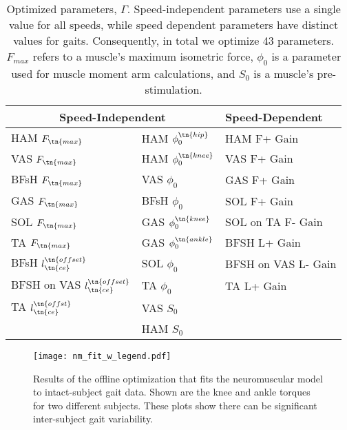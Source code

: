 \begin{table}    
    \centering
    \begin{tabular}{ll|l}
        \multicolumn{2}{c|}{Speed-Independent} & Speed-Dependent \\
        \hline
        HAM $F_\tn{max}$                    & HAM $\phi_0^\tn{hip}$   & HAM F+ Gain         \\
        VAS $F_\tn{max}$                    & HAM $\phi_0^\tn{knee}$  & VAS F+ Gain         \\
        BFsH $F_\tn{max}$                   & VAS $\phi_0$            & GAS F+ Gain         \\
        GAS $F_\tn{max}$                    & BFsH $\phi_0$           & SOL F+ Gain         \\
        SOL $F_\tn{max}$                    & GAS $\phi_0^\tn{knee}$  & SOL on TA F- Gain   \\
        TA  $F_\tn{max}$                    & GAS $\phi_0^\tn{ankle}$ & BFSH L+ Gain        \\
        BFsH $l_\tn{ce}^\tn{offset}$        & SOL $\phi_0$            & BFSH on VAS L- Gain \\
        BFSH on VAS $l_\tn{ce}^\tn{offset}$ & TA  $\phi_0$            & TA L+ Gain          \\
        TA $l_\tn{ce}^\tn{offst}$           & VAS $S_0$               &                     \\
                                            & HAM $S_0$               &                     \\
    \end{tabular}
    \caption{Optimized parameters, $\Gamma$. Speed-independent parameters use a
    single value for all speeds, while speed dependent parameters have distinct
    values for  gaits. Consequently, in total
    we optimize 43 parameters. $F_{max}$ refers to a muscle's maximum isometric
    force, $\phi_0$ is a parameter used for muscle moment arm calculations, and
    $S_0$ is a muscle's pre-stimulation.}\label{tab:params}
\end{table}

\begin{figure}
    \centering 
    \texttt{[image: nm\_fit\_w\_legend.pdf]}
    \caption{Results of the offline optimization that fits the neuromuscular
    model to intact-subject gait data. Shown are the knee and ankle torques for
    two different subjects. These plots show there can be significant
    inter-subject gait variability.}\label{fig:nm_fit}
\end{figure}

